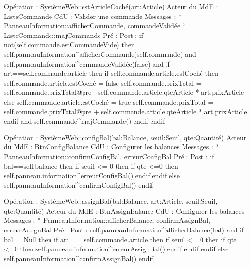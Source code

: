 Opération : SystèmeWeb::estArticleCoché(art:Article)
Acteur du MdE : ListeCommande
CdU : Valider une commande
Messages : 
* PanneauInformation::{afficherCommande, commandeValidée}
* ListeCommande::{majCommande}
Pré :
Post :  
        if not(self.commande.estCommandeVide) then
                self.panneauInformation^afficherCommande(self.commande) 
                and
                self.panneauInformation^commandeValidée(false) 
                and
                if art==self.commande.article then
                        if self.commande.article.estCoché then
                                self.commande.article.estCoché = false
                                self.commande.prixTotal = self.commande.prixTotal@pre - 
                                        self.commande.article.qteArticle * art.prixArticle
                        else 
                                self.commande.article.estCoché = true
                                self.commande.prixTotal = self.commande.prixTotal@pre + 
                                        self.commande.article.qteArticle * art.prixArticle
                        endif
                        and 
                        self.commande^majCommande()
                endif
        endif




Opération : SystèmeWeb::configBal(bal:Balance, seuil:Seuil, qte:Quantité)
Acteur du MdE : BtnConfigBalance 
CdU : Configurer les balances
Messages : 
* PanneauInformation::{confirmConfigBal, erreurConfigBal}
Pré :
Post :  
        if bal==self.balance then
                if seuil <= 0 then
                        if qte <=0 then
                                self.panneau.information^erreurConfigBal()
                        endif
                endif
        else
                self.panneauInformation^confirmConfigBal()
        endif


Opération : SystèmeWeb::assignBal(bal:Balance, art:Article, seuil:Seuil, qte:Quantité)
Acteur du MdE : BtnAssignBalance 
CdU : Configurer les balances
Messages :
* PanneauInformation::{afficherBalance, confirmAssignBal, erreurAssignBal}
Pré :
Post : 
        self.panneauInformation^afficherBalance(bal)
and
        if bal==Null then
                if art == self.commande.article then
                        if seuil <= 0 then
                                if qte <=0 then
                                        self.panneau.information^erreurAssignBal()
                                endif
                        endif
                endif
        else
                self.panneauInformation^confirmAssignBal()
        endif
        
        
